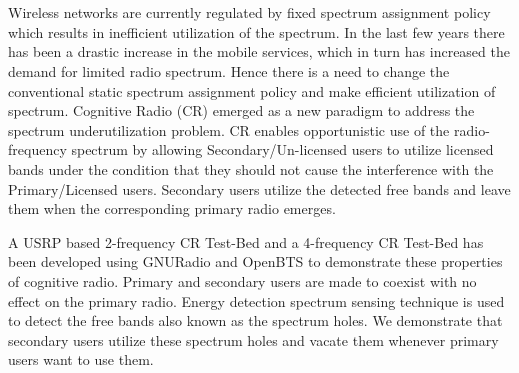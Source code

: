 \chapter*{}


Wireless networks are currently regulated by fixed spectrum assignment policy
which results in inefficient utilization of the spectrum. In the last few
years there has been a drastic increase in the mobile services, which in turn
has increased the demand for limited radio spectrum. Hence there is a need to
change the conventional static spectrum assignment policy and make efficient
utilization of spectrum. Cognitive Radio (CR) emerged as a new paradigm to
address the spectrum underutilization problem.  CR enables opportunistic use
of the radio-frequency spectrum by allowing Secondary/Un-licensed users to
utilize licensed bands under the condition that they should not cause the
interference with the Primary/Licensed users. Secondary users utilize the
detected free bands and leave them when the corresponding primary radio
emerges.

A USRP based 2-frequency CR Test-Bed and a 4-frequency CR Test-Bed has been
developed using GNURadio and OpenBTS to demonstrate these properties of
cognitive radio. Primary and secondary users are made to coexist with no
effect on the primary radio. Energy detection spectrum sensing technique is
used to detect the free bands also known as the spectrum holes. We demonstrate
that secondary users utilize these spectrum holes and vacate them whenever
primary users want to use them.
